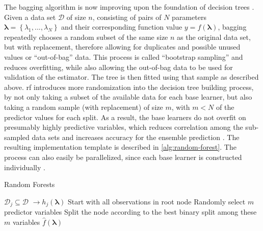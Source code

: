 The bagging algorithm is now improving upon the foundation of decision trees \cite{breiman1996bagging}. Given a data set $\mathcal{D}$ of size $n$, consisting of pairs of $N$ parameters $\mathbf{\lambda} = \left\lbrace \lambda_1,...,\lambda_N\right\rbrace $ and their corresponding function value $y = f(\mathbf{\lambda})$, bagging repeatedly chooses a random subset of the same size $n$ as the original data set, but with replacement, therefore allowing for duplicates and possible unused values or \enquote{out-of-bag} data. This process is called \enquote{bootstrap sampling} and reduces overfitting, while also allowing the out-of-bag data to be used for validation of the estimator. The tree is then fitted using that sample as described above.
\gls{rf} introduces more randomization into the decision tree building process, by not only taking a subset of the available data for each base learner, but also taking a random sample (with replacement) of size $m$, with $m < N$ of the predictor values for each split. As a result, the base learners do not overfit on presumably highly predictive variables, which reduces correlation among the sub-sampled data sets and increases accuracy for the ensemble prediction \cite{ho2002data}. The resulting implementation template is described in \cref{alg:random-forest}. The process can also easily be parallelized, since each base learner is constructed individually \cite{cutler2012random}.

\begin{algorithm}
	\caption{Random Forests}
	\label{alg:random-forest}
	\begin{algorithmic}
			\State $\mathcal{D}_j \subseteq \mathcal{D}$ 
			 $ \to h_j(\mathbf{\lambda})$
				\State Start with all observations in root node
					\State Randomly select $m$ predictor variables
					\State Split the node according to the best binary split among these $m$ variables
				\EndFor
			\EndProcedure
		\EndFor
		\Return $\hat{f}(\mathbf{\lambda})$ 
	\end{algorithmic}
\end{algorithm}

